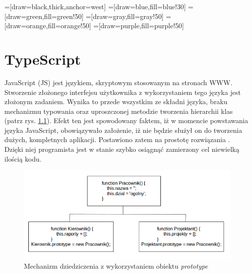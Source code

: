 \usetikzlibrary{trees}
=[draw=black,thick,anchor=west]
=[draw=blue,fill=blue!30]
=[draw=green,fill=green!50]
=[draw=gray,fill=gray!50]
=[draw=orange,fill=orange!50]
=[draw=purple,fill=purple!50]
\chapter{TypeScript}
JavaScript (JS) jest językiem, skryptowym stosowanym na stronach WWW\cite{javascript-book}. Stworzenie złożonego interfejsu użytkownika z wykorzystaniem tego języka jest złożonym zadaniem. Wynika to przede wszystkim ze składni języka, braku mechanizmu typowania oraz uproszczonej metodzie tworzenia hierarchii klas (patrz rys. \ref{fig:javascript-inheritance}). Efekt ten jest spowodowany faktem, iż w momencie powstawania języka JavaScript, obowiązywało założenie, iż nie będzie służył on do tworzenia dużych, kompletnych aplikacji. Postawiono zatem na prostotę rozwiązania \cite{javascript-book}. Dzięki niej programista jest w stanie szybko osiągnąć zamierzony cel niewielką ilością kodu.

\begin{figure}[h]
	\includegraphics[width=140mm]{./img/javascript-inheritance.png}
	\centering
	\caption{Mechanizm dziedziczenia z wykorzystaniem obiektu \textit{prototype}}
	\label{fig:javascript-inheritance}
\end{figure}



